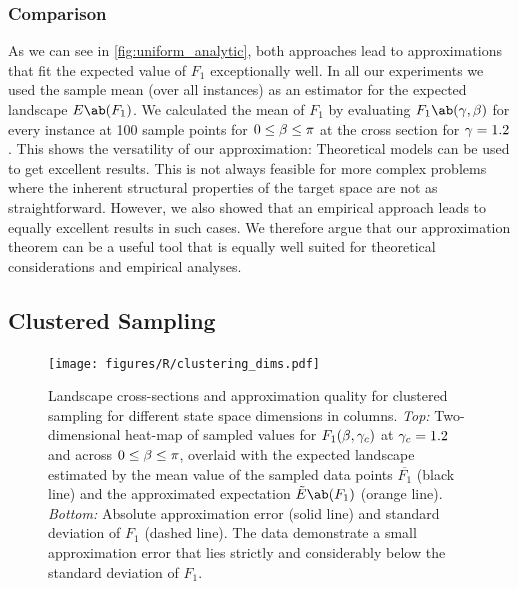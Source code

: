\subsubsection{Comparison}
As we can see in \cref{fig:uniform_analytic}, both approaches lead to approximations that fit the expected value of $F_1$ exceptionally well. In all our experiments we used the sample mean (over all instances) as an estimator for the expected landscape $E\ab(F_1)$. We calculated the mean of $F_1$ by evaluating $F_1\ab(\pangle, \mangle)$ for every instance at 100 sample points for $0 \leq \beta \leq \pi$ at the cross section for $\gamma = 1.2$. This shows the versatility of our approximation: Theoretical models can be used to get excellent results. This is not always feasible for more complex problems where the inherent structural properties of the target space are not as straightforward. However, we also showed that an empirical approach leads to equally excellent results in such cases. We therefore argue that our approximation theorem can be a useful tool that is equally well suited for theoretical considerations and empirical analyses. 

\subsection{Clustered Sampling}
\begin{figure}[htbp]
    \texttt{[image: figures/R/clustering\_dims.pdf]}\vspace*{-2em}
    \caption{Landscape cross-sections and approximation quality for clustered sampling for different state space dimensions 
    in columns. \emph{Top:} Two-dimensional heat-map of sampled values for $F_1 (\beta, \gamma_{c})$ at $\gamma_{c} = 1.2$ and across $0 \leq \beta \leq \pi$, overlaid with the expected landscape estimated by the mean value of the sampled data points $\overline{F_1}$  (black line) and the approximated expectation $\tilde{E}\ab(F_1)$  (orange line). \emph{Bottom:} Absolute approximation error (solid line) and standard deviation of $F_1$ (dashed line). The data demonstrate a small approximation error that lies strictly and considerably below the standard deviation of $F_1$.}
    \label{fig:clustered_dims}
\end{figure}

